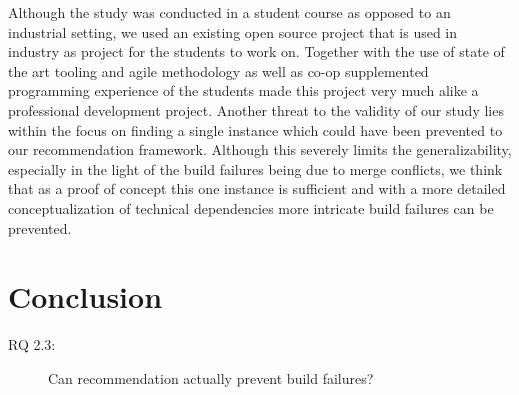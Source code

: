 Although the study was conducted in a student course as opposed to an industrial setting, we used an existing open source project that is used in industry as project for the students to work on.
Together with the use of state of the art tooling and agile methodology as well as co-op supplemented programming experience of the students made this project very much alike a professional development project.
Another threat to the validity of our study lies within the focus on finding a single instance which could have been prevented to our recommendation framework.
Although this severely limits the generalizability, especially in the light of the build failures being due to merge conflicts, we think that as a proof of concept this one instance is sufficient and with a more detailed conceptualization of technical dependencies more intricate build failures can be prevented.

\section{Conclusion}
\begin{description}
  \item[RQ 2.3:] Can recommendation actually prevent build failures?
\end{description}
